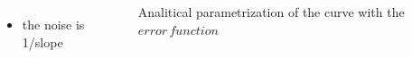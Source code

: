 \begin{frame}
\begin{columns}
\begin{itemize}
                    \item the noise is 1/slope 
                \end{itemize}
                \medskip
                Analitical parametrization of the curve with the $error\,function$
        \end{columns}
    \end{frame}


